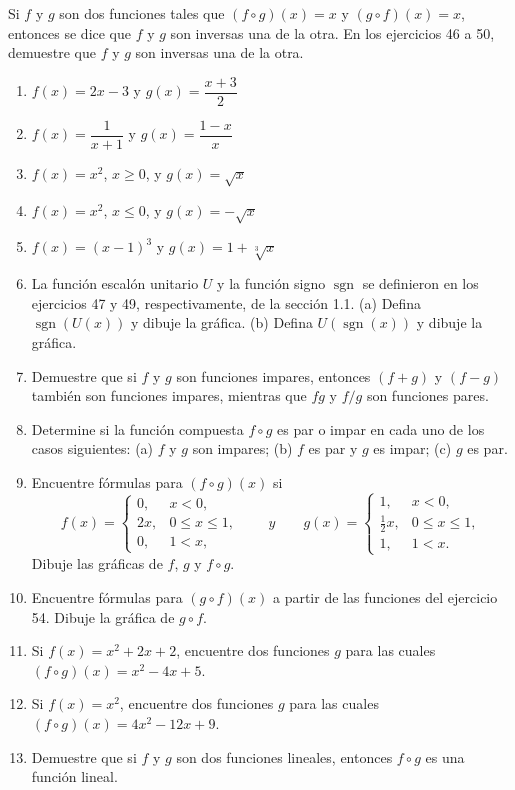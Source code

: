 \documentclass[12pt]{article}
\theoremstyle{remark}
\begin{document}
Si $f$ y $g$ son dos funciones tales que $(f\circ g)(x)=x$ y $(g\circ f)(x)=x$, entonces se dice que $f$ y $g$ son inversas una de la otra. En los ejercicios 46 a 50, demuestre que $f$ y $g$ son inversas una de la otra.

\begin{enumerate}[start=46]
\item $f(x)=2x-3$ y $g(x)=\dfrac{x+3}{2}$
\item $f(x)=\dfrac1{x+1}$ y $g(x)=\dfrac{1-x}{x}$
\item $f(x)=x^2$, $x\ge0$, y $g(x)=\sqrt{x}$
\item $f(x)=x^2$, $x\le0$, y $g(x)=-\sqrt{x}$
\item $f(x)=(x-1)^3$ y $g(x)=1+\sqrt[3]{x}$
\item La función escalón unitario $U$ y la función signo $\operatorname{sgn}$ se definieron en los ejercicios 47 y 49, respectivamente, de la sección 1.1. (a) Defina $\operatorname{sgn}(U(x))$ y dibuje la gráfica. (b) Defina $U(\operatorname{sgn}(x))$ y dibuje la gráfica.
\item Demuestre que si $f$ y $g$ son funciones impares, entonces $(f+g)$ y $(f-g)$ también son funciones impares, mientras que $fg$ y $f/g$ son funciones pares.
\item Determine si la función compuesta $f\circ g$ es par o impar en cada uno de los casos siguientes: (a) $f$ y $g$ son impares; (b) $f$ es par y $g$ es impar; (c) $g$ es par.
\item Encuentre fórmulas para $(f\circ g)(x)$ si
\[
f(x)=\begin{cases}0,&x<0,\\2x,&0\le x\le1,\\0,&1<x,\end{cases}
\qquad
y\qquad
g(x)=\begin{cases}1,&x<0,\\\frac12x,&0\le x\le1,\\1,&1<x.\end{cases}
\]
Dibuje las gráficas de $f$, $g$ y $f\circ g$.
\item Encuentre fórmulas para $(g\circ f)(x)$ a partir de las funciones del ejercicio 54. Dibuje la gráfica de $g\circ f$.
\item Si $f(x)=x^2+2x+2$, encuentre dos funciones $g$ para las cuales $(f\circ g)(x)=x^2-4x+5$.
\item Si $f(x)=x^2$, encuentre dos funciones $g$ para las cuales $(f\circ g)(x)=4x^2-12x+9$.
\item Demuestre que si $f$ y $g$ son dos funciones lineales, entonces $f\circ g$ es una función lineal.

\end{enumerate}
\end{document}
